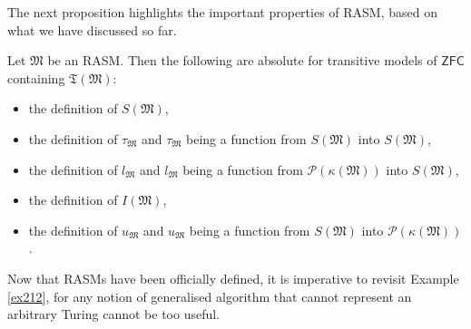 \documentclass[12pt]{article}
\numberwithin{equation}{section}
\begin{document}
The next proposition highlights the important properties of RASM, based on what we have discussed so far.

\begin{prop}\label{prop226}
Let $\mathfrak{M}$ be an RASM. Then the following are absolute for transitive models of $\mathsf{ZFC}$ containing $\mathfrak{T}(\mathfrak{M})$:
\begin{itemize}
    \item the definition of $S(\mathfrak{M})$,
    \item the definition of $\tau_{\mathfrak{M}}$ and $\tau_{\mathfrak{M}}$ being a function from $S(\mathfrak{M})$ into $S(\mathfrak{M})$,
    \item the definition of $l_{\mathfrak{M}}$ and $l_{\mathfrak{M}}$ being a function from $\mathcal{P}(\kappa(\mathfrak{M}))$ into $S(\mathfrak{M})$,
    \item the definition of $I(\mathfrak{M})$,
    \item the definition of $u_{\mathfrak{M}}$ and $u_{\mathfrak{M}}$ being a function from $S(\mathfrak{M})$ into $\mathcal{P}(\kappa(\mathfrak{M}))$. 
\end{itemize}
\end{prop}

Now that RASMs have been officially defined, it is imperative to revisit Example \ref{ex212}, for any notion of generalised algorithm that cannot represent an arbitrary Turing cannot be too useful.
\end{document}
